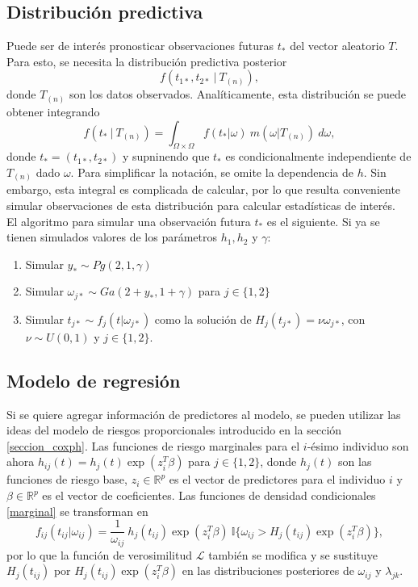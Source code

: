 \documentclass[11pt,a4paper]{article}
\begin{document}
\subsection{Distribución predictiva}
\label{sec:predict}
Puede ser de interés pronosticar observaciones futuras $t_*$ del vector aleatorio $T$. Para esto, se necesita la distribución predictiva posterior $$f(t_{1*}, t_{2*} \ | \ T_{(n)}),$$ donde $T_{(n)}$ son los datos observados. Analíticamente, esta distribución se puede obtener integrando $$f(t_* \ | \ T_{(n)}) = \int_{\Omega \times \Omega} f(t_* | \omega) \ m(\omega | T_{(n)}) \ d\omega,$$ donde $t_*=(t_{1*}, t_{2*})$ y supninendo que $t_*$ es condicionalmente independiente de $T_{(n)}$ dado $\omega$. Para simplificar la notación, se omite la dependencia de $h$. Sin embargo, esta integral es complicada de calcular, por lo que resulta conveniente simular observaciones de esta distribución para calcular estadísticas de interés.\\

El algoritmo para simular una observación futura $t_*$ es el siguiente. Si ya se tienen simulados valores de los parámetros $h_1, h_2$ y $\gamma$:
\begin{enumerate}
\item Simular $y_* \sim Pg(2, 1, \gamma)$
\item Simular $\omega_{j*} \sim Ga(2 + y_*, 1 + \gamma)$ para $j\in \lbrace 1, 2 \rbrace$
\item Simular $t_{j*} \sim f_j(t|\omega_{j*})$ como la solución de $H_j(t_{j*}) = \nu \omega_{j*}$, con $\nu \sim U(0, 1)$ y $j\in \lbrace 1, 2 \rbrace$.\\
\end{enumerate}

\subsection{Modelo de regresión}

Si se quiere agregar información de predictores al modelo, se pueden utilizar las ideas del modelo de riesgos proporcionales introducido en la sección \ref{seccion_coxph}. Las funciones de riesgo marginales para el $i$-ésimo individuo son ahora $h_{ij}(t) = h_j(t)\exp (z_i^T\beta)$ para $j\in \lbrace 1, 2 \rbrace$, donde $h_j(t)$ son las funciones de riesgo base, $z_i \in \mathbb{R}^p$ es el vector de predictores para el individuo $i$ y $\beta\in \mathbb{R}^p$ es el vector de coeficientes. Las funciones de densidad condicionales \eqref{marginal} se transforman en
$$f_{ij}(t_{ij} | \omega_{ij}) = \frac{1}{\omega_{ij}} \ h_j(t_{ij})\exp (z_i^T\beta) \ \mathbb{I}\lbrace \omega_{ij} > H_j(t_{ij})\exp (z_i^T\beta) \rbrace,$$ por lo que la función de verosimilitud $\mathcal{L}$ también se modifica y se sustituye $H_j(t_{ij})$ por $H_j(t_{ij}) \exp (z_i^T\beta)$ en las distribuciones posteriores de $\omega_{ij}$ y $\lambda_{jk}$.\\
\end{document}
